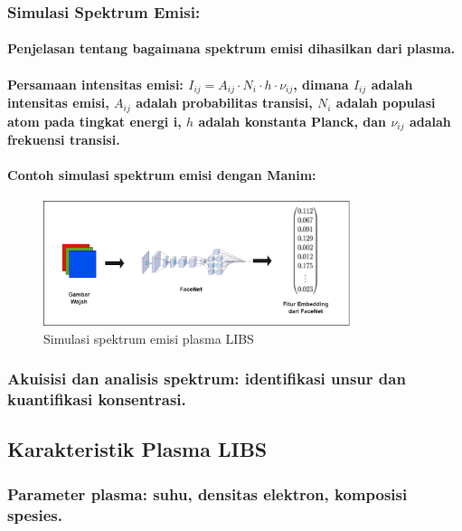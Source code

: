 \subsubsection{Simulasi Spektrum Emisi:}

\paragraph{Penjelasan tentang bagaimana spektrum emisi dihasilkan dari plasma.}
\paragraph{Persamaan intensitas emisi:  $I_{ij} = A_{ij} \cdot N_i \cdot h \cdot \nu_{ij}$,  dimana $I_{ij}$ adalah intensitas emisi, $A_{ij}$ adalah probabilitas transisi, $N_i$ adalah populasi atom pada tingkat energi i, $h$ adalah konstanta Planck, dan  $\nu_{ij}$ adalah frekuensi transisi.}
\paragraph{Contoh simulasi spektrum emisi dengan Manim:}

\begin{figure}[h]
    \centering
    \includegraphics[width=0.8\textwidth]{image/simulasi_spektrum_emisi.png} %
    \caption{Simulasi spektrum emisi plasma LIBS}
    \label{fig:simulasi_spektrum_emisi}
\end{figure}

\subsubsection{Akuisisi dan analisis spektrum: identifikasi unsur dan kuantifikasi konsentrasi.}


\subsection{Karakteristik Plasma LIBS}

\subsubsection{Parameter plasma: suhu, densitas elektron, komposisi spesies.}
